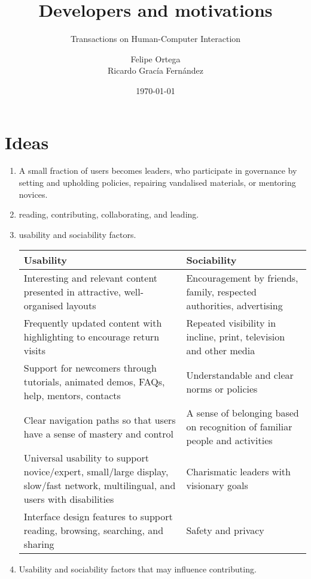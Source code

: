\documentclass[11pt]{scrartcl}
\title{\textbf{Developers and motivations}}
\subtitle{Transactions on Human-Computer Interaction}
\author{Felipe Ortega\\
		Ricardo Grac\'ia Fern\'andez}
\date{\today}
\begin{document}
\maketitle

\section{Ideas}

	\begin{enumerate}
	
		\item A small fraction of users becomes leaders, who participate in governance by setting and upholding policies, repairing vandalised materials, or mentoring novices.
		\item reading, contributing, collaborating, and leading.
		\item usability and sociability factors.\\

		\begin{tabular}{ | p{6,5cm} | p{} |}
			\hline
			Usability & Sociability \\ \hline
			Interesting and relevant content presented in attractive, well-organised layouts & Encouragement by friends, family, respected authorities, advertising \\ \hline
			Frequently updated content with highlighting to encourage return visits & Repeated visibility in incline, print, television and other media \\ \hline
			Support for newcomers through tutorials, animated demos, FAQs, help, mentors, contacts & Understandable and clear norms or policies \\ \hline
			Clear navigation paths so that users have a sense of mastery and control & A sense of belonging based on recognition of familiar people and activities \\ \hline
			Universal usability to support novice/expert, small/large display, slow/fast network, multilingual, and users with disabilities & Charismatic leaders with visionary goals \\ \hline
			Interface design features to support reading, browsing, searching, and sharing & Safety and privacy \\ \hline
		\end{tabular}
					
		\item Usability and sociability factors that may influence contributing.\\


\end{enumerate}
\end{document}
